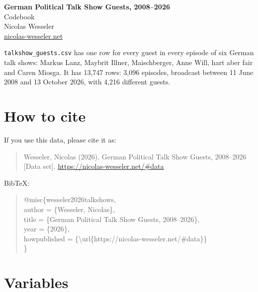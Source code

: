 \documentclass[11pt]{article}
\begin{document}
\pagestyle{empty}

\begin{center}
    {\LARGE \textbf{German Political Talk Show Guests, 2008--2026}} \\[0.3em]
    {\large Codebook} \\[0.3em]
    Nicolas Wesseler \\
    \href{https://nicolas-wesseler.net/}{nicolas-wesseler.net}
\end{center}

\vspace{1em}

\texttt{talkshow\_guests.csv} has one row for every guest in every episode of six German talk
shows: Markus Lanz, Maybrit Illner, Maischberger, Anne Will, hart aber fair and Caren Miosga. It
has 13{,}747 rows: 3{,}096 episodes, broadcast between 11 June 2008 and 13 October 2026, with
4{,}216 different guests.

\section*{How to cite}

If you use this data, please cite it as:

\begin{quote}
\noindent\ttfamily Wesseler, Nicolas (2026). German Political Talk Show Guests, 2008--2026 [Data set]. \url{https://nicolas-wesseler.net/#data}
\end{quote}

BibTeX:

\begin{quote}
\ttfamily
\noindent @misc\{wesseler2026talkshows,\\
\hspace*{1.5em}author = \{Wesseler, Nicolas\},\\
\hspace*{1.5em}title = \{German Political Talk Show Guests, 2008--2026\},\\
\hspace*{1.5em}year = \{2026\},\\
\hspace*{1.5em}howpublished = \{\textbackslash url\{https://nicolas-wesseler.net/\#data\}\}\\
\}
\end{quote}

\section*{Variables}
\end{document}
